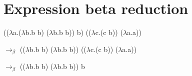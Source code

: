\documentclass{article}
\begin{document}
\section{Expression beta reduction}
{\Large (($\lambda$a.($\lambda$b.b b) ($\lambda$b.b b)) b) (($\lambda$c.(c b)) ($\lambda$a.a)) \par
$\rightarrow_\beta$ (($\lambda$b.b b) ($\lambda$b.b b)) (($\lambda$c.(c b)) ($\lambda$a.a)) \par 
$\rightarrow_\beta$ (($\lambda$b.b b) ($\lambda$b.b b)) b}
\end{document}
